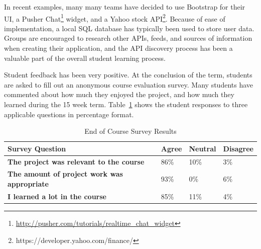 \documentclass{sig-alternate}
\begin{document}
In recent examples, many many teams have decided to use Bootstrap for their UI, a Pusher Chat\footnote{\url{http://pusher.com/tutorials/realtime_chat_widget}} widget, and a Yahoo stock API\footnote{https://developer.yahoo.com/finance/}.  Because of ease of implementation, a local SQL database has typically been used to store user data. Groups are encouraged to research other APIs, feeds, and sources of information when creating their application, and the API discovery process has been a valuable part of the overall student learning process.

Student feedback has been very positive. At the conclusion of the term, students are asked to fill out an anonymous course evaluation survey. Many students have commented about how much they enjoyed the project, and how much they learned during the 15 week term. Table~\ref{table:surveyresults} shows the student responses to three applicable questions in percentage format.


\begin{table}[h]
  \caption{End of Course Survey Results}
     \begin{tabular}{ p{4.1cm} | p{0.95cm} | p{0.95cm} | p{0.95cm} }
	\bfseries Survey Question & \bfseries Agree & \bfseries Neutral & \bfseries Disagree \\ \hline \hline
	\bfseries The project was relevant to the course & 86\% & 10\% & 3\% \\ \hline
	\bfseries The amount of project work was appropriate & 93\% & 0\% & 6\% \\ \hline
	\bfseries I learned a lot in the course & 85\% & 11\% & 4\%\\

  \end{tabular}
  \label{table:surveyresults}

\end{table}

\end{document}

